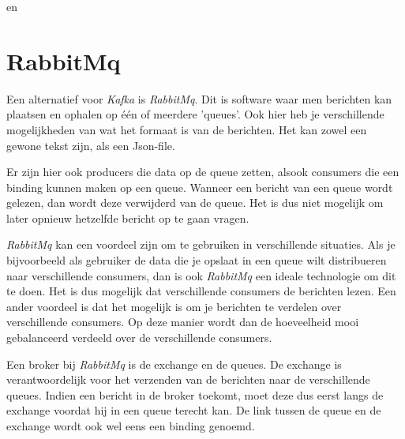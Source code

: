 \autocite{Sookocheff2015} en \autocite{Johansson2016}

\section{RabbitMq}

Een alternatief voor \emph{Kafka} is \emph{RabbitMq}. Dit is software waar men berichten kan plaatsen en ophalen op één of meerdere 'queues'. Ook hier heb je verschillende mogelijkheden van wat het formaat is van de berichten. Het kan zowel een gewone tekst zijn, als een Json-file. 

Er zijn hier ook producers die data op de queue zetten, alsook consumers die een binding kunnen maken op een queue. Wanneer een bericht van een queue wordt gelezen, dan wordt deze verwijderd van de queue. Het is dus niet mogelijk om later opnieuw hetzelfde bericht op te gaan vragen. 

\emph{RabbitMq} kan een voordeel zijn om te gebruiken in verschillende situaties. Als je bijvoorbeeld als gebruiker de data die je opslaat in een queue wilt distribueren naar verschillende consumers, dan is ook \emph{RabbitMq} een ideale technologie om dit te doen. Het is dus mogelijk dat verschillende consumers de berichten lezen. Een ander voordeel is dat het mogelijk is om je berichten te verdelen over verschillende consumers. Op deze manier wordt dan de hoeveelheid mooi gebalanceerd verdeeld over de verschillende consumers.

Een broker bij \emph{RabbitMq} is de exchange en de queues. De exchange is verantwoordelijk voor het verzenden van de berichten naar de verschillende queues. Indien een bericht in de broker toekomt, moet deze dus eerst langs de exchange voordat hij in een queue terecht kan. De link tussen de queue en de exchange wordt ook wel eens een binding genoemd.

